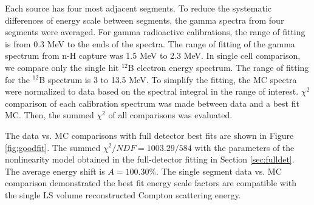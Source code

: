 Each source has four most adjacent segments.
To reduce the systematic differences of energy scale between segments, the gamma spectra from four segments were averaged. 
For gamma radioactive calibrations, the range of fitting is from 0.3 MeV to the ends of the spectra.
The range of fitting of the gamma spectrum from n-H capture was 1.5 MeV to 2.3 MeV.
In single cell comparison, we compare only the single hit $^{12}$B electron energy spectrum.
The range of fitting for the $^{12}$B spectrum is 3 to 13.5 MeV. 
To simplify the fitting, the MC spectra were normalized to data based on the spectral integral in the range of interest.
$\chi^2$ comparison of each calibration spectrum was made between data and a best fit MC. 
Then, the summed $\chi^2$ of all comparisons was evaluated.

The data vs. MC comparisons with full detector best fits are shown in Figure \ref{fig:goodfit}. 
The summed $\chi^2/NDF = 1003.29/584$ with the parameters of the nonlinearity model obtained in the full-detector fitting in Section \ref{sec:fulldet}.
The average energy shift is $A=100.30\%$.
The single segment data vs. MC comparison demonstrated the best fit energy scale factors are compatible with the single LS volume reconstructed Compton scattering energy.

